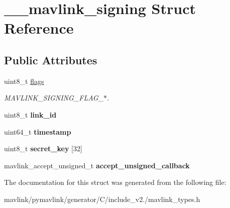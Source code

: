 \hypertarget{struct____mavlink__signing}{}\section{\+\_\+\+\_\+mavlink\+\_\+signing Struct Reference}
\label{struct____mavlink__signing}
\subsection*{Public Attributes}
\begin{DoxyCompactItemize}
\item 
\mbox{\label{struct____mavlink__signing_a5e08957249da64329f7ee29c1c503516}} 
uint8\+\_\+t \hyperlink{struct____mavlink__signing_a5e08957249da64329f7ee29c1c503516}{flags}
\begin{DoxyCompactList}\small\item\em M\+A\+V\+L\+I\+N\+K\+\_\+\+S\+I\+G\+N\+I\+N\+G\+\_\+\+F\+L\+A\+G\+\_\+$\ast$. \end{DoxyCompactList}\item 
\mbox{\label{struct____mavlink__signing_a03d44bb3079f7af6924d6868846ccc57}} 
uint8\+\_\+t {\bfseries link\+\_\+id}
\item 
\mbox{\label{struct____mavlink__signing_ac6010de27e406777d336935ba93ddac1}} 
uint64\+\_\+t {\bfseries timestamp}
\item 
\mbox{\label{struct____mavlink__signing_ade31cece3d550b1bf2e41c9c38b9964f}} 
uint8\+\_\+t {\bfseries secret\+\_\+key} \mbox{[}32\mbox{]}
\item 
\mbox{\label{struct____mavlink__signing_a74f675ae2e09c5a793c06d5005cd7d1b}} 
mavlink\+\_\+accept\+\_\+unsigned\+\_\+t {\bfseries accept\+\_\+unsigned\+\_\+callback}
\end{DoxyCompactItemize}


The documentation for this struct was generated from the following file\+:\begin{DoxyCompactItemize}
\item 
mavlink/pymavlink/generator/\+C/include\+\_\+v2./mavlink\+\_\+types.\+h\end{DoxyCompactItemize}
